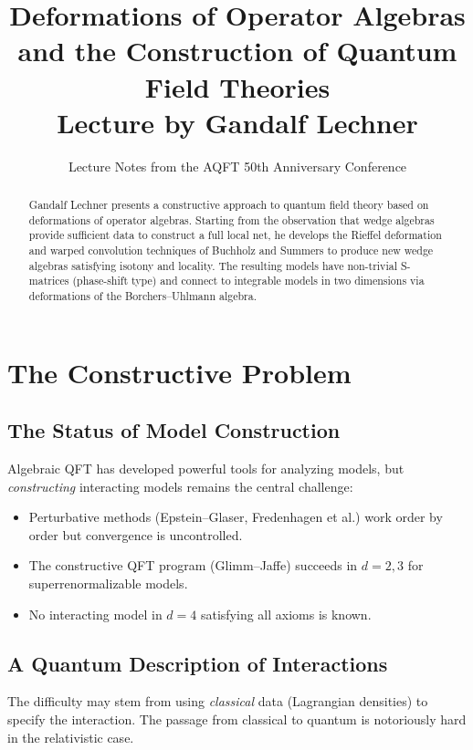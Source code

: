 \documentclass[11pt,a4paper]{article}
\title{\textbf{Deformations of Operator Algebras\\and the Construction of Quantum Field Theories}\\[6pt]
\large Lecture by Gandalf Lechner}
\author{Lecture Notes from the AQFT 50th Anniversary Conference}
\date{}
\begin{document}
\maketitle

\begin{abstract}
Gandalf Lechner presents a constructive approach to quantum field theory based on
deformations of operator algebras. Starting from the observation that wedge algebras
provide sufficient data to construct a full local net, he develops the Rieffel
deformation and warped convolution techniques of Buchholz and Summers to produce
new wedge algebras satisfying isotony and locality. The resulting models have
non-trivial S-matrices (phase-shift type) and connect to integrable models in two
dimensions via deformations of the Borchers--Uhlmann algebra.
\end{abstract}

\tableofcontents

\section{The Constructive Problem}

\subsection{The Status of Model Construction}

Algebraic QFT has developed powerful tools for analyzing models, but
\emph{constructing} interacting models remains the central challenge:
\begin{itemize}[nosep]
  \item Perturbative methods (Epstein--Glaser, Fredenhagen et al.) work
        order by order but convergence is uncontrolled.
  \item The constructive QFT program (Glimm--Jaffe) succeeds in $d=2,3$
        for superrenormalizable models.
  \item No interacting model in $d=4$ satisfying all axioms is known.
\end{itemize}

\subsection{A Quantum Description of Interactions}

The difficulty may stem from using \emph{classical} data (Lagrangian densities)
to specify the interaction. The passage from classical to quantum is
notoriously hard in the relativistic case.
\end{document}
